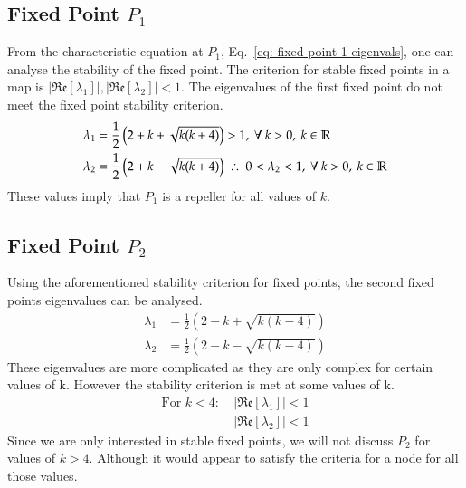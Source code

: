 \documentclass{article}
\begin{document}
\subsection{Fixed Point $P_1$}
From the characteristic equation at $P_1$, Eq.~\ref{eq: fixed point 1 eigenvals}, one can analyse the stability of the fixed point. The criterion for stable fixed points in a map is $|\mathfrak{Re}[\lambda_1]|,|\mathfrak{Re}[\lambda_2]|<1$. The eigenvalues of  the first fixed point do not meet the fixed point stability criterion.
\begin{equation}
\begin{split}
\lambda_{1} &= \frac{1}{2}\left(2+k+\sqrt{k(k+4)}\right)>1, ~\forall~ k>0, ~k\in \mathbb{R}\\
\lambda_{2} &= \frac{1}{2}\left(2+k-\sqrt{k(k+4)}\right)~\therefore~0<\lambda_2<1, ~\forall~ k>0, ~k\in \mathbb{R}
\end{split}
\end{equation}
These values imply that $P_1$ is a repeller for all values of $k$.
\subsection{Fixed Point $P_2$}
Using the aforementioned stability criterion for fixed points, the second fixed points eigenvalues can be analysed.
\begin{equation}
\begin{split}
\lambda_{1} &= \frac{1}{2}\left(2-k+\sqrt{k(k-4)}\right)\\
\lambda_{2} &= \frac{1}{2}\left(2-k-\sqrt{k(k-4)}\right)
\end{split}
\end{equation}
These eigenvalues are more complicated as they are only complex for certain values of k. However the stability criterion is met at some values of k.
\begin{equation}
\begin{split}
\text{For } k<4:~ & |\mathfrak{Re}[\lambda_1]|<1\\
&|\mathfrak{Re}[\lambda_2]|<1
\end{split}
\end{equation}
Since we are only interested in stable fixed points, we will not discuss $P_2$ for values of $k>4$. Although it would appear to satisfy the criteria for a node for all those values.
\end{document}
